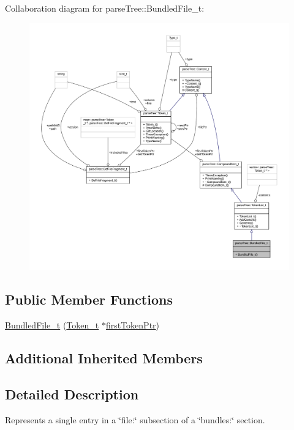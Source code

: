 Collaboration diagram for parse\+Tree\+:\+:Bundled\+File\+\_\+t\+:
\nopagebreak
\begin{figure}[H]
\begin{center}
\leavevmode
\includegraphics[width=350pt]{structparse_tree_1_1_bundled_file__t__coll__graph}
\end{center}
\end{figure}
\subsection*{Public Member Functions}
\begin{DoxyCompactItemize}
\item 
\hyperlink{structparse_tree_1_1_bundled_file__t_af114a2611b3b276829ab6b80fe4029a9}{Bundled\+File\+\_\+t} (\hyperlink{structparse_tree_1_1_token__t}{Token\+\_\+t} $\ast$\hyperlink{structparse_tree_1_1_compound_item__t_a587020c943e760cb0152dd8cd31e21ef}{first\+Token\+Ptr})
\end{DoxyCompactItemize}
\subsection*{Additional Inherited Members}


\subsection{Detailed Description}
Represents a single entry in a \char`\"{}file\+:\char`\"{} subsection of a \char`\"{}bundles\+:\char`\"{} section. 

